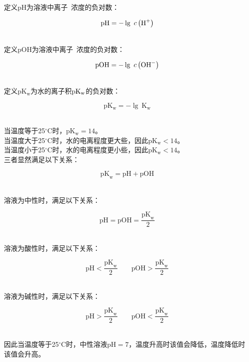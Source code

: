 \documentclass[UTF8]{ctexart}
\begin{document}
\newpage

    定义pH为溶液中离子~浓度的负对数：
    \begin{large}
        \begin{equation*}
            \text{pH}=-\lg~c\left(\ce{H+}\right)
        \end{equation*}
    \end{large}\\
    定义pOH为溶液中离子~浓度的负对数：
    \begin{large}
        \begin{equation*}
            \text{pOH}=-\lg~c\left(\ce{OH-}\right)
        \end{equation*}
    \end{large}\\
    定义p$\text{K}_\text{w}$为水的离子积p$\text{\text{K}}_\text{w}$的负对数：
    \begin{large}
        \begin{equation*}
            \text{p}\text{K}_\text{w}=-\lg~\text{K}_\text{w}
        \end{equation*}
    \end{large}\\
    当温度等于25$^\circ$C时，p$\text{K}_\text{w}=14$。\\[3mm]
    当温度大于25$^\circ$C时，水的电离程度更大些，因此p$\text{K}_\text{w}<14$。\\[3mm]
    当温度小于25$^\circ$C时，水的电离程度更小些，因此p$\text{K}_\text{w}<14$。\\[6mm]
    三者显然满足以下关系：
    \begin{large}
        \begin{equation*}
            \text{pK}_\text{w}=\text{pH}+\text{pOH}
        \end{equation*}
    \end{large}\\
    溶液为中性时，满足以下关系：
    \begin{large}
        \begin{equation*}
            \text{pH}=\text{pOH}=\frac{\text{pK}_\text{w}}{2}
        \end{equation*}
    \end{large}\\
    溶液为酸性时，满足以下关系：
    \begin{large}
        \begin{equation*}
            \text{pH}<\frac{\text{pK}_\text{w}}{2}\qquad\text{pOH}>\frac{\text{pK}_\text{w}}{2}
        \end{equation*}
    \end{large}\\
    溶液为碱性时，满足以下关系：
    \begin{large}
        \begin{equation*}
            \text{pH}>\frac{\text{pK}_\text{w}}{2}\qquad\text{pOH}<\frac{\text{pK}_\text{w}}{2}
        \end{equation*}
    \end{large}\\
    因此当温度等于25$^\circ$C时，中性溶液pH$=7$，温度升高时该值会降低，温度降低时该值会升高。
\end{document}
